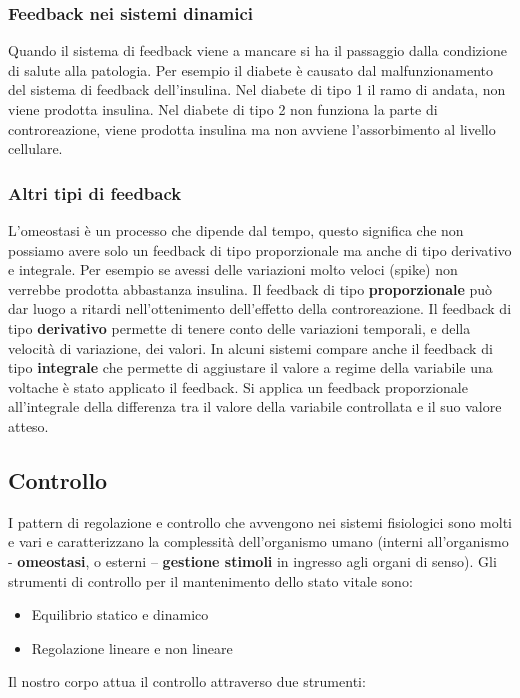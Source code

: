 \subsubsection{Feedback nei sistemi dinamici}
Quando il sistema di feedback viene a mancare si ha il passaggio dalla condizione di salute alla patologia. Per esempio il diabete è causato dal malfunzionamento del sistema di feedback dell'insulina. Nel diabete di tipo 1 il ramo di andata, non viene prodotta insulina. Nel diabete di tipo 2 non funziona la parte di controreazione, viene prodotta insulina ma non avviene l'assorbimento al livello cellulare. 

\subsubsection{Altri tipi di feedback}
L'omeostasi è un processo che dipende dal tempo, questo significa che non possiamo avere solo un feedback di tipo proporzionale ma anche di tipo derivativo e integrale. Per esempio se avessi delle variazioni molto veloci (spike) non verrebbe prodotta abbastanza insulina.
Il feedback di tipo \textbf{proporzionale} può dar luogo a ritardi nell'ottenimento dell'effetto della controreazione.
Il feedback di tipo \textbf{derivativo} permette di tenere conto delle variazioni temporali, e della velocità di variazione, dei valori.
In alcuni sistemi compare anche il feedback di tipo \textbf{integrale} che permette di aggiustare il valore a regime della variabile una voltache è stato applicato il feedback. Si applica un feedback proporzionale all'integrale della differenza tra il valore della variabile controllata e il suo valore atteso. 

\subsection{Controllo}
I pattern di regolazione e controllo che avvengono nei sistemi
fisiologici sono molti e vari e caratterizzano la complessità
dell'organismo umano (interni all'organismo - \textbf{omeostasi}, o
esterni – \textbf{gestione stimoli} in ingresso agli organi di senso). Gli strumenti di controllo per il mantenimento dello stato vitale sono:
\begin{itemize}
    \item Equilibrio statico e dinamico
    \item Regolazione lineare e non lineare
\end{itemize}
Il nostro corpo attua il controllo attraverso due strumenti:
